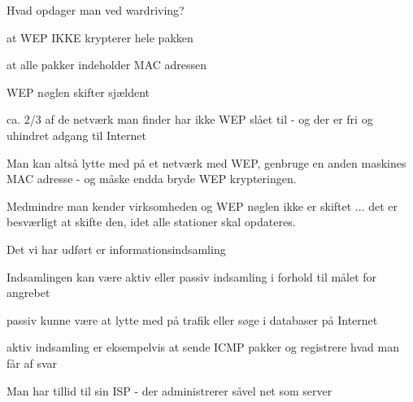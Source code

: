 \documentclass[20pt,landscape,a4paper,footrule]{foils}
\begin{document}

\begin{list1}
\item Hvad opdager man ved wardriving?
\begin{list2}
\item at WEP IKKE krypterer hele pakken
\item at alle pakker indeholder MAC adressen
\item WEP nøglen skifter sjældent
\item ca. 2/3 af de netværk man finder har ikke WEP slået til - og der
  er fri og uhindret adgang til Internet
\end{list2}
\item {\color{red}
Man kan altså lytte med på et netværk med WEP, genbruge en anden
maskines MAC adresse - og måske endda bryde WEP krypteringen.}
\item
Medmindre man kender virksomheden og WEP nøglen ikke er skiftet ...
det er besværligt at skifte den, idet alle stationer skal opdateres.
\end{list1}




\begin{list1}
\item Det vi har udført er informationsindsamling
\item Indsamlingen kan være aktiv eller passiv indsamling i forhold
  til målet for angrebet
\item passiv kunne være at lytte med på trafik eller søge i databaser
  på Internet
\item aktiv indsamling er eksempelvis at sende ICMP pakker og
  registrere hvad man får af svar
\end{list1}






\begin{list1}
\item Man har tillid til sin ISP - der administrerer såvel net som server
\end{list1}

\end{document}
